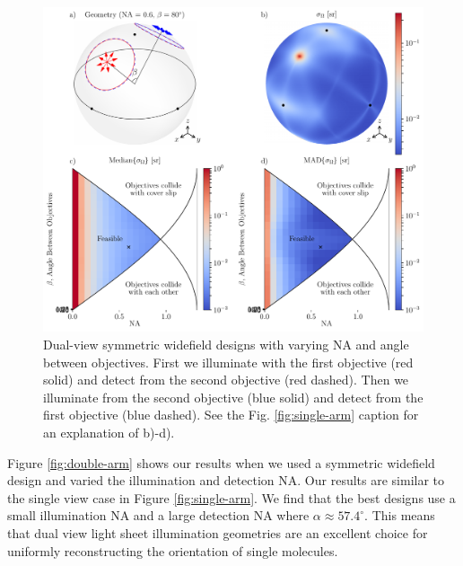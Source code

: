 \documentclass[10pt]{article}
\begin{document}
\begin{figure}[htbp]
\centering\includegraphics[width=\textwidth]{symmetric-widefield}
\caption{Dual-view symmetric widefield designs with varying NA and angle between
  objectives. First we illuminate with the first objective (red solid) and
  detect from the second objective (red dashed). Then we illuminate from the
  second objective (blue solid) and detect from the first objective (blue
  dashed). See the Fig. \ref{fig:single-arm} caption for an explanation of
  b)-d).}
\label{fig:symmetric-widefield}
\end{figure}

Figure \ref{fig:double-arm} shows our results when we used a symmetric widefield
design and varied the illumination and detection NA. Our results are similar to
the single view case in Figure \ref{fig:single-arm}. We find that the best
designs use a small illumination NA and a large detection NA where
$\alpha \approx 57.4^{\circ}$. This means that dual view light sheet illumination
geometries are an excellent choice for uniformly reconstructing the orientation
of single molecules.
\end{document}
